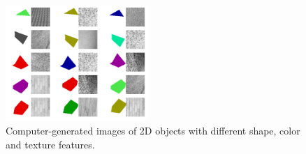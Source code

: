 \begin{figure}[t!]
    \begin{center}
        \includegraphics[width=0.48\textwidth]{figures/generated_images.pdf}
    \end{center}
    \caption{Computer-generated images of 2D objects with
    different shape, color and texture features.}
    \label{fig:generated_images}
\end{figure}

